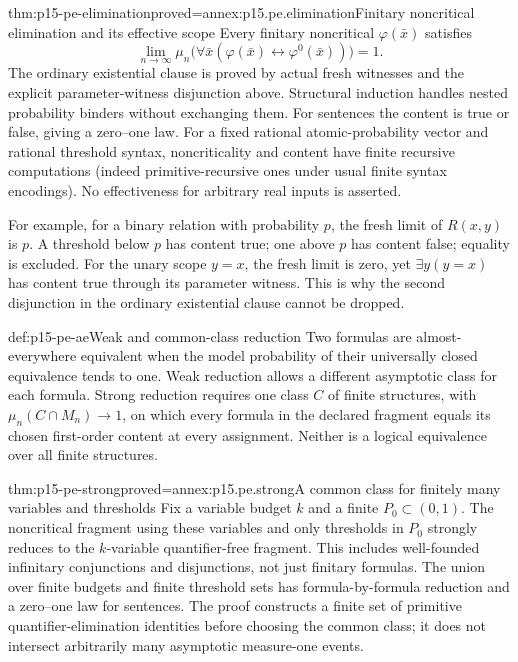 \begin{hbtheorem}{thm:p15-pe-elimination}{proved=annex:p15.pe.elimination}{Finitary noncritical elimination and its effective scope}
Every finitary noncritical \(\varphi(\bar x)\) satisfies
\[
 \lim_{n\to\infty}\mu_n
       \bigl(\forall\bar x(\varphi(\bar x)\leftrightarrow
                                      \varphi^0(\bar x))\bigr)=1.
\]
The ordinary existential clause is proved by actual fresh witnesses
and the explicit parameter-witness disjunction above. Structural
induction handles nested probability binders without exchanging them.
For sentences the content is true or false, giving a zero--one law.
For a fixed rational atomic-probability vector and rational threshold
syntax, noncriticality and content have finite recursive computations
(indeed primitive-recursive ones under usual finite syntax encodings).
No effectiveness for arbitrary real inputs is asserted.
\end{hbtheorem}

For example, for a binary relation with probability \(p\), the fresh
limit of \(R(x,y)\) is \(p\). A threshold below \(p\) has content true;
one above \(p\) has content false; equality is excluded. For the unary
scope \(y=x\), the fresh limit is zero, yet \(\exists y(y=x)\) has
content true through its parameter witness. This is why the second
disjunction in the ordinary existential clause cannot be dropped.

\begin{hbdefinition}{def:p15-pe-ae}{Weak and common-class reduction}
Two formulas are almost-everywhere equivalent when the model probability
of their universally closed equivalence tends to one. Weak reduction
allows a different asymptotic class for each formula. Strong reduction
requires one class \(C\) of finite structures, with
\(\mu_n(C\cap M_n)\to1\), on which every formula in the declared fragment
equals its chosen first-order content at every assignment.
Neither is a logical equivalence over all finite structures.
\end{hbdefinition}

\begin{hbtheorem}{thm:p15-pe-strong}{proved=annex:p15.pe.strong}{A common class for finitely many variables and thresholds}
Fix a variable budget \(k\) and a finite \(P_0\subset(0,1)\).
The noncritical fragment using these variables and only thresholds in
\(P_0\) strongly reduces to the \(k\)-variable quantifier-free fragment.
This includes well-founded infinitary conjunctions and disjunctions,
not just finitary formulas. The union over finite budgets and finite
threshold sets has formula-by-formula reduction and a zero--one law
for sentences. The proof constructs a finite set of primitive
quantifier-elimination identities before choosing the common class;
it does not intersect arbitrarily many asymptotic measure-one events.
\end{hbtheorem}

